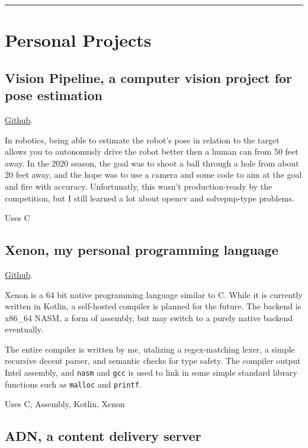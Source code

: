 \documentclass[10pt,letterpaper]{article}
\newcommand{\CPP}
{C\nolinebreak[4]\hspace{-.05em}\raisebox{.35ex}{\footnotesize\bf ++}}
\def\code#1{\texttt{#1}}
\begin{document}
    \hrule
    

    \section*{Personal Projects}

    \subsection*{Vision Pipeline, a computer vision project for pose estimation}
    \href{https://github.com/CougarProgramming623/vision-pipeline}{Github}. 
    
    In robotics, being able to estimate the robot's pose in relation to the target
    allows you to autonomusly drive the robot better then a human can from 50 feet away.
    In the 2020 season, the goal was to shoot a ball through a hole from about 20 feet away,
    and the hope was to use a camera and some code to aim at the goal and fire with accuracy.
    Unfortunatly, this wasn't production-ready by the competition,
    but I still learned a lot about opencv and solvepnp-type problems. 

    \vspace{0.5em}
    \noindent Uses \CPP
    
    
    \subsection*{Xenon, my personal programming language}
    \href{https://github.com/Mee42/Xenon}{Github}.
    
    Xenon is a 64 bit native programming language similar to C.
    While it is currently written in Kotlin, a self-hosted compiler is planned for the future.
    The backend is x86\_64 NASM, a form of assembly,
    but may switch to a purely native backend eventually.
    
    The entire compiler is written by me, utalizing a regex-matching lexer, 
    a simple recursive decent parser,
    and semantic checks for type safety.
    The compiler output Intel assembly,
    and \code{nasm} and \code{gcc} is used to link in some simple standard library functions such as
    \code{malloc} and \code{printf}.
    
    \vspace{0.5em}
    \noindent Uses C, Assembly, Kotlin, Xenon

    \subsection*{ADN, a content delivery server}
    
\end{document}
